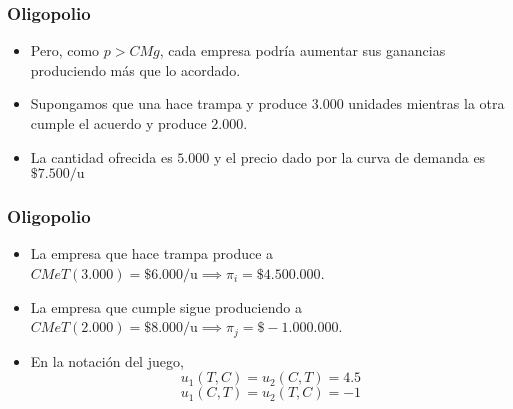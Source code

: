 \documentclass[dvipsnames,table,leqno]{beamer}
\newcommand{\peq}[1]{{\scriptscriptstyle{#1}}}
\newcommand{\rp}[1]{\left(#1\right)}
\begin{document}
\begin{frame}
\begin{figure}[htbp!]
\begin{subfigure}[b]{0.49\textwidth}
				\end{subfigure}
			\end{figure}	
		\end{frame}	

		\begin{frame}
			\frametitle{Oligopolio}
			\begin{itemize}
				\item Pero, como $p>CMg$, cada empresa podría aumentar sus ganancias produciendo más que lo acordado.
				\item Supongamos que una hace trampa y produce $3.000$ unidades mientras la otra cumple el acuerdo y produce $2.000$.
				\item La cantidad ofrecida es $5.000$ y el precio dado por la curva de demanda es $\$7.500/\text{u}$
			\end{itemize}
		\end{frame}	

		\begin{frame}
			\frametitle{Oligopolio}
			\begin{itemize}
				\item La empresa que hace trampa produce a $CMeT\rp{3.000}=\$6.000/\text{u}\implies\pi_\peq{i}=\$4.500.000$.
				\item La empresa que cumple sigue produciendo a $CMeT\rp{2.000}=\$8.000/\text{u}\implies\pi_\peq{j}=\$-1.000.000$.
				\item En la notación del juego, $$u_\peq{1}\rp{T,C}=u_\peq{2}\rp{C,T}=4.5$$ $$u_\peq{1}\rp{C,T}=u_\peq{2}\rp{T,C}=-1$$
			\end{itemize}
		\end{frame}	
\end{document}
